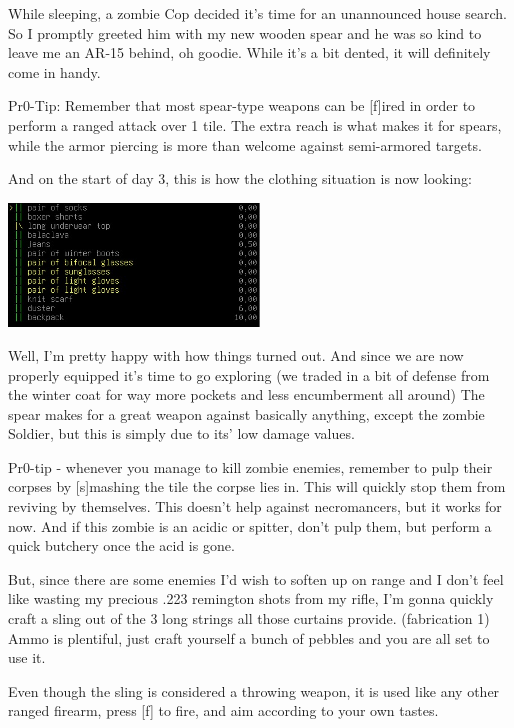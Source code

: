 \documentclass[11pt]{report}
\begin{document}
While sleeping, a zombie Cop decided it's time for an unannounced house search. So I promptly greeted him with my new wooden spear and he was so kind to leave me an AR-15 behind, oh goodie. While it's a bit dented, it will definitely come in handy.

Pr0-Tip: Remember that most spear-type weapons can be [f]ired in order to perform a ranged attack over 1 tile. The extra reach is what makes it for spears, while the armor piercing is more than welcome against semi-armored targets.

And on the start of day 3, this is how the clothing situation is now looking:

\begin{center}
\includegraphics[width=0.5\textwidth]{12}
\end{center}

Well, I'm pretty happy with how things turned out. And since we are now properly equipped it's time to go exploring (we traded in a bit of defense from the winter coat for way more pockets and less encumberment all around) The spear makes for a great weapon against basically anything, except the zombie Soldier, but this is simply due to its' low damage values.

Pr0-tip - whenever you manage to kill zombie enemies, remember to pulp their corpses by [s]mashing the tile the corpse lies in. This will quickly stop them from reviving by themselves. This doesn't help against necromancers, but it works for now. And if this zombie is an acidic or spitter, don't pulp them, but perform a quick butchery once the acid is gone.

But, since there are some enemies I'd wish to soften up on range and I don't feel like wasting my precious .223 remington shots from my rifle, I'm gonna quickly craft a sling out of the 3 long strings all those curtains provide. (fabrication 1) Ammo is plentiful, just craft yourself a bunch of pebbles and you are all set to use it.

Even though the sling is considered a throwing weapon, it is used like any other ranged firearm, press [f] to fire, and aim according to your own tastes.
\end{document}
